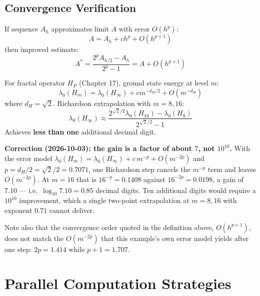 \subsection{Convergence Verification}

\begin{defn}\label{def:richardson}
If sequence $A_h$ approximates limit $A$ with error $O(h^p)$:
\begin{equation}
A = A_h + c h^p + O(h^{p+1})
\end{equation}
then improved estimate:
\begin{equation}
A^* = \frac{2^p A_{h/2} - A_h}{2^p - 1} = A + O(h^{p+1})
\end{equation}
\end{defn}

\begin{example}
For fractal operator $H_P$ (Chapter 17), ground state energy at level $m$:
\begin{equation}
\lambda_0(H_m) = \lambda_0(H_\infty) + c m^{-d_H/2} + O(m^{-d_H})
\end{equation}
where $d_H = \sqrt{2}$. Richardson extrapolation with $m = 8, 16$:
\begin{equation}
\lambda_0(H_\infty) \approx \frac{2^{\sqrt{2}/2} \lambda_0(H_{16}) - \lambda_0(H_8)}{2^{\sqrt{2}/2} - 1}
\end{equation}
Achieves \textbf{less than one} additional decimal digit.

\medskip
\noindent\textbf{Correction (2026-10-03): the gain is a factor of about $7$, not
$10^{10}$.}
With the error model $\lambda_0(H_m) = \lambda_0(H_\infty) + c\,m^{-p} + O(m^{-2p})$
and $p = d_H/2 = \sqrt2/2 = 0.7071$, one Richardson step cancels the $m^{-p}$
term and leaves $O(m^{-2p})$. At $m = 16$ that is $16^{-p} = 0.1408$ against
$16^{-2p} = 0.0198$, a gain of $7.10$ --- i.e.\ $\log_{10} 7.10 = 0.85$ decimal
digits. Ten additional digits would require a $10^{10}$ improvement, which a
single two-point extrapolation at $m = 8, 16$ with exponent $0.71$ cannot deliver.

Note also that the convergence order quoted in the definition above,
$O(h^{p+1})$, does not match the $O(m^{-2p})$ that this example's own error model
yields after one step: $2p = 1.414$ while $p + 1 = 1.707$.
\end{example}

\section{Parallel Computation Strategies}
\label{sec:parallel-computation}

